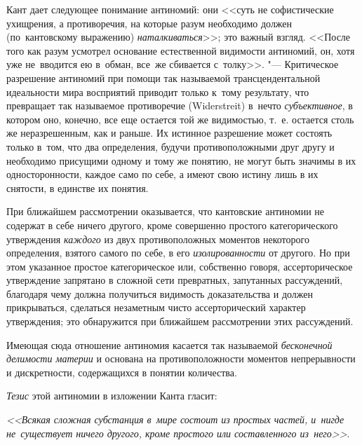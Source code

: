 Кант дает следующее понимание антиномий: они <<суть не софистические
ухищрения, а противоречия, на которые разум необходимо должен (по~кантовскому
выражению) {\em наталкиваться}>>; это важный взгляд. <<После того как
разум усмотрел основание естественной видимости антиномий, он, хотя уже
не~вводится ею в~обман, все~же сбивается с~толку>>. "--- Критическое разрешение антиномий при помощи так
называемой трансцендентальной идеальности мира восприятий приводит только
к~тому результату, что превращает так называемое противоречие (Wider\-streit)
в~нечто {\em субъективное}, в котором оно, конечно, все еще остается той же
видимостью, т.~е. остается столь же неразрешенным, как и раньше. Их истинное
разрешение может состоять только в~том, что два определения, будучи
противоположными друг другу и необходимо присущими одному и тому же понятию, не
могут быть значимы в их односторонности, каждое само по себе, а имеют свою
истину лишь в их снятости, в единстве их понятия.

При ближайшем рассмотрении оказывается, что кантовские антиномии не содержат
в себе ничего другого, кроме совершенно простого категорического
утверждения {\em каждого} из двух противоположных
моментов некоторого определения, взятого самого по себе, в его
{\em изолированности} от другого. Но при этом указанное
простое категорическое или, собственно говоря, ассерторическое утверждение
запрятано в сложной сети превратных, запутанных рассуждений, благодаря чему
должна получиться видимость доказательства и должен прикрываться, сделаться
незаметным чисто ассерторический характер утверждения; это обнаружится при
ближайшем рассмотрении этих рассуждений.

Имеющая сюда отношение антиномия касается так называемой
{\em бесконечной делимости материи} и основана на
противоположности моментов непрерывности и дискретности, содержащихся в
понятии количества.

{\em Тезис} этой антиномии в изложении Канта гласит:

{\em <<Всякая сложная субстанция в~мире состоит из простых частей, и~нигде
не~существует ничего другого, кроме простого или составленного
из~него>>}.

